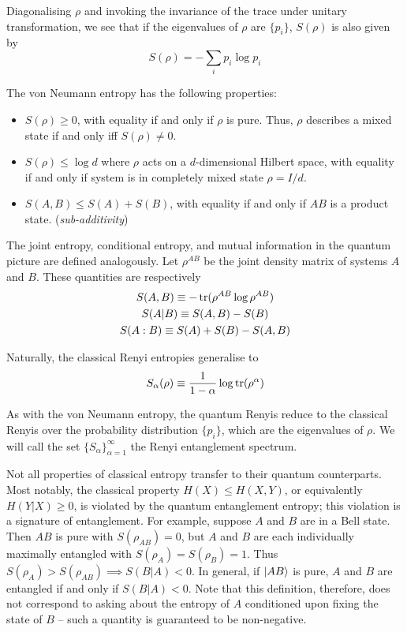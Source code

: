 \documentclass[10pt]{article}
\begin{document}
Diagonalising $\rho$ and invoking the invariance of the trace under unitary transformation, we see that if the eigenvalues of $\rho$ are $\{p_i\}$, $S(\rho)$ is also given by
\begin{equation}
S(\rho) = - \sum_i p_i \log p_i
\end{equation}

The von Neumann entropy has the following properties:

\begin{itemize}

\item $S(\rho) \geq 0$, with equality if and only if $\rho$ is pure. Thus, $\rho$ describes a mixed state if and only iff $S(\rho) \neq 0$.

\item $S(\rho) \leq \log d$ where $\rho$ acts on a $d$-dimensional Hilbert space, with equality if and only if system is in completely mixed state $\rho=I/d$.

\item $S(A,B) \leq S(A) + S(B)$, with equality if and only if $AB$ is a product state. (\emph{sub-additivity})

\end{itemize}

The joint entropy, conditional entropy, and mutual information in the quantum picture are defined analogously. Let $\rho^{AB}$ be the joint density matrix of systems $A$ and $B$. These quantities are respectively
\begin{gather}
S(A,B) \equiv - \trace(\rho^{AB} \log \rho^{AB}) \\
S(A|B) \equiv S(A,B) - S(B) \\
S(A:B) \equiv S(A) + S(B) - S(A,B)
\end{gather}

Naturally, the classical Renyi entropies generalise to
\begin{equation}
S_\alpha(\rho) \equiv \frac{1}{1-\alpha} \log \trace (\rho^\alpha)
\end{equation}

As with the von Neumann entropy, the quantum Renyis reduce to the classical Renyis over the probability distribution $\{p_i\}$, which are the eigenvalues of $\rho$.  We will call the set $\{S_\alpha\}_{\alpha=1}^\infty$ the Renyi entanglement spectrum.

Not all properties of classical entropy transfer to their quantum counterparts. Most notably, the classical property $H(X) \leq H(X,Y)$, or equivalently $H(Y|X) \geq 0$, is violated by the quantum entanglement entropy; this violation is a signature of entanglement. For example, suppose $A$ and $B$ are in a Bell state. Then $AB$ is pure with $S(\rho_{AB})=0$, but $A$ and $B$ are each individually maximally entangled with $S(\rho_A)=S(\rho_B)=1$. Thus $S(\rho_A) > S(\rho_{AB}) \implies S(B|A)<0$. In general, if $\ket{AB}$ is pure, $A$ and $B$ are entangled if and only if $S(B|A)<0$. Note that this definition, therefore, does not correspond to asking about the entropy of $A$ conditioned upon fixing the state of $B$ -- such a quantity is guaranteed to be non-negative.
\end{document}
